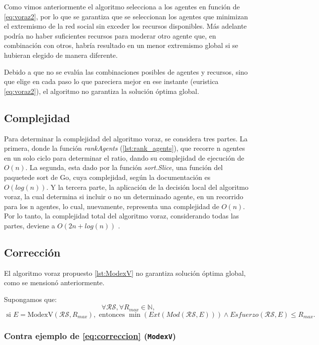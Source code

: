\documentclass[letterpaper,10pt]{article}
\begin{document}
Como vimos anteriormente el algoritmo selecciona a los agentes en función de \eqref{eq:voraz2}, por lo que se garantiza que se seleccionan los agentes que minimizan el extremismo de la red social sin exceder los recursos disponibles. Más adelante podría no haber suficientes recursos para moderar otro agente que, en combinación con otros, habría resultado en un menor extremismo global si se hubieran elegido de manera diferente.

Debido a que no se evalúa las combinaciones posibles de agentes y recursos, sino que elige en cada paso lo que pareciera mejor en ese instante (euristica \eqref{eq:voraz2}), el algoritmo no garantiza la solución óptima global.

\subsection{Complejidad}
\label{subsec:complejidad_algoritmo_voraz}
Para determinar la complejidad del algoritmo voraz, se considera tres partes. La primera, donde la función \textit{rankAgents} (\ref{lst:rank_agents}), que recorre n agentes en un solo ciclo para determinar el ratio, dando su complejidad de ejecución de \(O(n)\). La segunda, esta dado por la función \textit{sort.Slice}, una función del paquetede sort de Go, cuya complejidad, según la documentación es \(O(log(n))\). Y la tercera parte, la aplicación de la decisión local del algoritmo voraz, la cual determina si incluir o no un determinado agente, en un recorrido para los n agentes, lo cual, nuevamente, representa una complejidad de \(O(n)\). Por lo tanto, la complejidad total del algoritmo voraz, considerando todas las partes, deviene a \(O(2n + log(n))\) .
\subsection{Corrección}
\label{subsec:correccion_algoritmo_voraz}
El algoritmo voraz propuesto \ref{lst:ModexV} no garantiza solución óptima global, como se mensionó anteriormente. 

Supongamos que:
\[
  \forall \mathcal{R}\mathcal{S}, \forall R_{max} \in \mathbb{N},
\]
\begin{equation}
\text{ si } E = \text{ModexV}(\mathcal{R}\mathcal{S}, R_{max}), \text{ entonces }
\min\left(Ext\left(Mod(\mathcal{R}\mathcal{S}, E)\right)\right) \land Esfuerzo(\mathcal{R}\mathcal{S}, E) \leq R_{max}.
\label{eq:correccion}
\end{equation}

\subsubsection*{Contra ejemplo de \eqref{eq:correccion} (\texttt{ModexV})}
\end{document}
